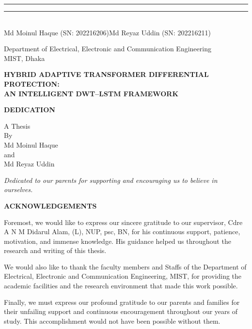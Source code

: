 \documentclass[12pt,a4paper,oneside]{report}
\newcommand{\frontchap}[1]{%
  \clearpage\thispagestyle{fancy}%
  \begin{center}\Large\bfseries #1\end{center}\vspace{6pt}}
\begin{document}
\noindent\rule{6cm}{0.4pt}\hfill\rule{6cm}{0.4pt}\\[2pt]
Md Moinul Haque (SN: 202216206)\hfill Md Reyaz Uddin (SN: 202216211)
\vfill
\begin{center}
Department of Electrical, Electronic and Communication Engineering\\ MIST, Dhaka
\end{center}

\clearpage\thispagestyle{fancy}
\begin{center}
{\large\bfseries HYBRID ADAPTIVE TRANSFORMER DIFFERENTIAL PROTECTION:\\ AN INTELLIGENT DWT--LSTM FRAMEWORK\par}
\vspace{0.35in}
{\bfseries DEDICATION\par}
\vspace{0.15in}
A Thesis\\
By\\
Md Moinul Haque \\
and \\
Md Reyaz Uddin
\end{center}
\vfill
\begin{center}\itshape\large
Dedicated to our parents for supporting and encouraging us to believe in ourselves.
\end{center}
\vfill

\frontchap{ACKNOWLEDGEMENTS}
Foremost, we would like to express our sincere gratitude to our supervisor, Cdre A N M Didarul Alam, (L), NUP, psc, BN, for his continuous support, patience, motivation, and immense knowledge. His guidance helped us throughout the research and writing of this thesis.

We would also like to thank the faculty members and Staffs of the Department of Electrical, Electronic and Communication Engineering, MIST, for providing the academic facilities and the research environment that made this work possible.

Finally, we must express our profound gratitude to our parents and families for their unfailing support and continuous encouragement throughout our years of study. This accomplishment would not have been possible without them.
\end{document}
